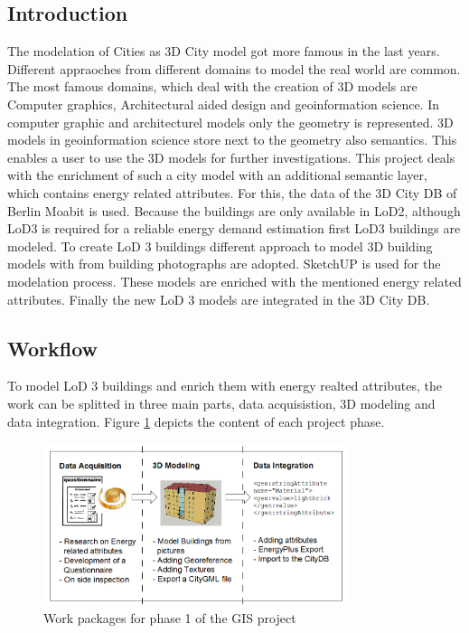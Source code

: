 \subsection{Introduction}
The modelation of Cities as 3D City model got more famous in the last years. Different appraoches from different domains to model the real world are common. The most famous domains, which deal with the creation of 3D models are Computer graphics, Architectural aided design and geoinformation science. In computer graphic and architecturel models only the geometry is represented. 3D models in geoinformation science store next to the geometry also semantics. This enables a user to use the 3D models for further investigations. This project deals with the enrichment of such a city model with an additional semantic layer, which contains energy related attributes. For this, the data of the 3D City DB of Berlin Moabit is used. Because the buildings are only available in LoD2, although LoD3 is required for a reliable energy demand estimation first LoD3 buildings are modeled. To create LoD 3 buildings different approach to model 3D building models with from building photographs are adopted. SketchUP is used for the 
modelation process. These models are enriched with the mentioned energy related attributes. Finally the new LoD 3 models are integrated in the 3D City DB.

\subsection{Workflow}
To model LoD 3 buildings and enrich them with energy realted attributes, the work can be splitted in three main parts, data acquisistion, 3D modeling and data integration. Figure \ref{fig:workflowph1} depicts the content of each project phase.

\begin{figure}[ht]
	\centering
	\includegraphics[width=0.8\textwidth]{phase1/group2/figures/workflow_phase1.png}
	\caption{Work packages for phase 1 of the GIS project}
	\label{fig:workflowph1}
\end{figure}

